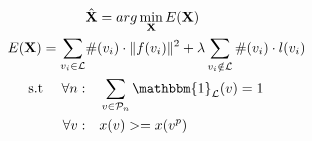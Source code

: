 


\begin{equation}
  \label{scale:eq:energy}
  \begin{split}
    &\hat{\mathbf{X}} = arg\min_{\mathbf{X}} E(\mathbf{X})\\
 E(\mathbf{X}) =  \sum_{v_i \in \mathcal{L}} &\#(v_i) \cdot \|f(v_i)\|^2 + \lambda  \sum_{v_i \notin \mathcal{L}}  \#(v_i) \cdot l(v_i) \\
 \text{s.t   }  \quad \forall n: & \quad \sum_{v \in \mathcal{P}_n} \mathbbm{1}_\mathcal{L} (v) = 1\\
              \quad \forall v:  & \quad x(v) >= x(v^p)\\
   \end{split}
\end{equation}

